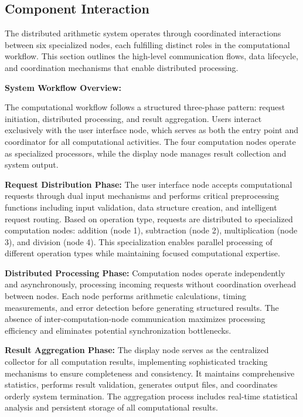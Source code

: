 \documentclass{article}
\begin{document}
\subsection{Component Interaction}

The distributed arithmetic system operates through coordinated interactions between six specialized nodes, each fulfilling distinct roles in the computational workflow. This section outlines the high-level communication flows, data lifecycle, and coordination mechanisms that enable distributed processing.

\textbf{System Workflow Overview:}

The computational workflow follows a structured three-phase pattern: request initiation, distributed processing, and result aggregation. Users interact exclusively with the user interface node, which serves as both the entry point and coordinator for all computational activities. The four computation nodes operate as specialized processors, while the display node manages result collection and system output.

\textbf{Request Distribution Phase:}
The user interface node accepts computational requests through dual input mechanisms and performs critical preprocessing functions including input validation, data structure creation, and intelligent request routing. Based on operation type, requests are distributed to specialized computation nodes: addition (node 1), subtraction (node 2), multiplication (node 3), and division (node 4). This specialization enables parallel processing of different operation types while maintaining focused computational expertise.

\textbf{Distributed Processing Phase:}
Computation nodes operate independently and asynchronously, processing incoming requests without coordination overhead between nodes. Each node performs arithmetic calculations, timing measurements, and error detection before generating structured results. The absence of inter-computation-node communication maximizes processing efficiency and eliminates potential synchronization bottlenecks.

\textbf{Result Aggregation Phase:}
The display node serves as the centralized collector for all computation results, implementing sophisticated tracking mechanisms to ensure completeness and consistency. It maintains comprehensive statistics, performs result validation, generates output files, and coordinates orderly system termination. The aggregation process includes real-time statistical analysis and persistent storage of all computational results.
\end{document}
